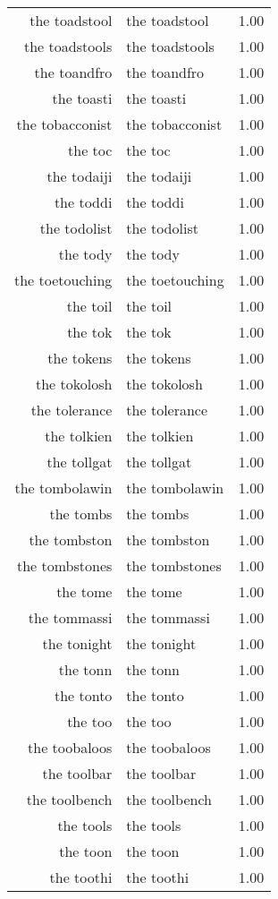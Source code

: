 \begin{table}[ht]
\begin{tabular}{rlr}
  the toadstool & the toadstool & 1.00 \\ 
  the toadstools & the toadstools & 1.00 \\ 
  the toandfro & the toandfro & 1.00 \\ 
  the toasti & the toasti & 1.00 \\ 
  the tobacconist & the tobacconist & 1.00 \\ 
  the toc & the toc & 1.00 \\ 
  the todaiji & the todaiji & 1.00 \\ 
  the toddi & the toddi & 1.00 \\ 
  the todolist & the todolist & 1.00 \\ 
  the tody & the tody & 1.00 \\ 
  the toetouching & the toetouching & 1.00 \\ 
  the toil & the toil & 1.00 \\ 
  the tok & the tok & 1.00 \\ 
  the tokens & the tokens & 1.00 \\ 
  the tokolosh & the tokolosh & 1.00 \\ 
  the tolerance & the tolerance & 1.00 \\ 
  the tolkien & the tolkien & 1.00 \\ 
  the tollgat & the tollgat & 1.00 \\ 
  the tombolawin & the tombolawin & 1.00 \\ 
  the tombs & the tombs & 1.00 \\ 
  the tombston & the tombston & 1.00 \\ 
  the tombstones & the tombstones & 1.00 \\ 
  the tome & the tome & 1.00 \\ 
  the tommassi & the tommassi & 1.00 \\ 
  the tonight & the tonight & 1.00 \\ 
  the tonn & the tonn & 1.00 \\ 
  the tonto & the tonto & 1.00 \\ 
  the too & the too & 1.00 \\ 
  the toobaloos & the toobaloos & 1.00 \\ 
  the toolbar & the toolbar & 1.00 \\ 
  the toolbench & the toolbench & 1.00 \\ 
  the tools & the tools & 1.00 \\ 
  the toon & the toon & 1.00 \\ 
  the toothi & the toothi & 1.00 \\ 

\end{tabular}
\end{table}
